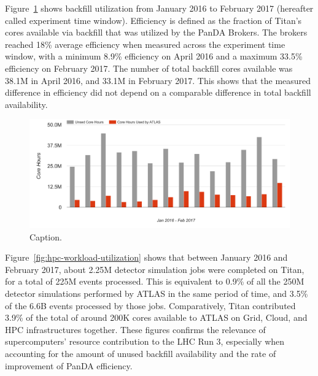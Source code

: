 Figure~\ref{fig:backfill-utilization} shows backfill utilization from January
2016 to February 2017 (hereafter called experiment time window).  Efficiency is defined as the fraction of Titan’s cores available
via backfill that was utilized by the PanDA Brokers.  The brokers reached 18\% average efficiency
when measured across the experiment time window,
with a minimum 8.9\% efficiency on April 2016 and a maximum 33.5\%
efficiency on February 2017. The number of total backfill cores available was
38.1M in April 2016, and 33.1M in February 2017. This shows that the measured
difference in efficiency did not depend on a comparable difference in total
backfill availability.

\begin{figure}[htp]
\includegraphics[clip,width=\columnwidth]{figures/backfill_consumption.png}
\caption{Caption. }
\label{fig:backfill-utilization}
\end{figure}

Figure~\ref{fig:hpc-workload-utilization} shows that between January 2016 and
February 2017, about 2.25M detector simulation jobs were completed on Titan, for
a total of 225M events processed. This is equivalent to 0.9\% of all the 250M
detector simulations performed by ATLAS in the same period of time, and 3.5\% of
the 6.6B events processed by those jobs. Comparatively, Titan contributed 3.9\%
of the total of around 200K cores available to ATLAS on Grid, Cloud, and HPC
infrastructures together. These figures confirms the relevance of
supercomputers' resource contribution to the LHC Run 3, especially when
accounting for the amount of unused backfill availability and the rate of
improvement of PanDA efficiency.

